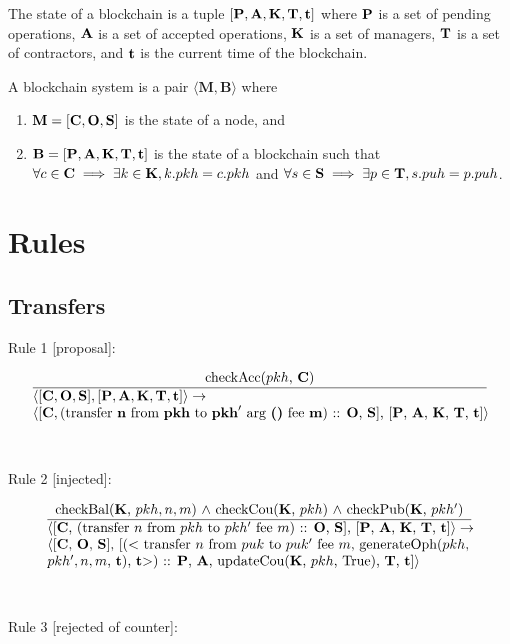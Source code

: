 \documentclass[a4paper]{llncs}
\begin{document}
\begin{definition}[Blockchain]
  The state of a blockchain is a tuple
  $[\textbf{P}, \textbf{A}, \textbf{K}, \textbf{T}, \textbf{t}]$ where
  $\textbf{P}$ is a set of pending operations,  $\textbf{A}$ is a set
  of accepted operations, $\textbf{K}$ is a set of managers,
  $\textbf{T}$ is a set of contractors, and $\textbf{t}$ is the current time of the blockchain. 
\end{definition}

\begin{definition}
A blockchain system is a pair
$\langle \mathbf{M}, \mathbf{B} \rangle$ where
\begin{enumerate}
\item $\mathbf{M} = [\textbf{C}, \textbf{O}, \textbf{S}]$ is the state of a node, and
\item $\mathbf{B} = [\textbf{P}, \textbf{A}, \textbf{K}, \textbf{T}, \textbf{t}]$ is the state of a blockchain 
  such that $\forall c \in \textbf{C} \implies \exists k\in \textbf{K}, k.pkh = c.pkh$
  and $\forall s \in \textbf{S} \implies \exists p \in \textbf{T}, s.puh = p.puh$.
\end{enumerate}
\end{definition}

\section{Rules}
\subsection{Transfers}

Rule 1 [proposal]:

\begin{equation}{}
  \frac{
    \text{checkAcc($pkh$, \ACCOUNTS)}
  }{
    \parbox{4.5in}{\text{$\langle[\ACCOUNTS, \OPERATIONS,
        \CONTRACTS], [\PENDING, \ACCEPTED, \MANAGERS, \CONTRACTORS,
        \TIME]\rangle \rightarrow$} \\
      \text{$\langle [\ACCOUNTS, (\TRANSFER\NTEZ\PKH{\PKH'}\MTEZ)$ ::
        \OPERATIONS, \CONTRACTS], [\PENDING, \ACCEPTED, \MANAGERS,
        \CONTRACTORS, \TIME]$\rangle$}}}  
\end{equation}
~\\
~\\
Rule 2 [injected]:

\begin{equation}{}
\frac{\text{checkBal(\MANAGERS, $pkh, n, m$) $\wedge$ checkCou(\MANAGERS, $pkh$) $\wedge$ checkPub(\MANAGERS, $pkh'$)}}{\parbox{4.2in}{\text{$\langle$[\ACCOUNTS, (transfer $n$ from $pkh$ to $pkh'$ fee $m$) :: \OPERATIONS, \CONTRACTS], [\PENDING, \ACCEPTED, \MANAGERS, \CONTRACTORS, \TIME]$\rangle \rightarrow$}\\
\text{$\langle$[\ACCOUNTS, \OPERATIONS, \CONTRACTS], [($<$ transfer $n$ from $puk$ to $puk'$ fee $m$, generateOph($pkh$, }\\
\text{$pkh', n, m$, \TIME), \TIME $>$) :: \PENDING, \ACCEPTED, updateCou(\MANAGERS, $pkh$, True), \CONTRACTORS, \TIME]$\rangle$}}} 
\end{equation}
~\\
~\\
Rule 3 [rejected of counter]:
\end{document}
